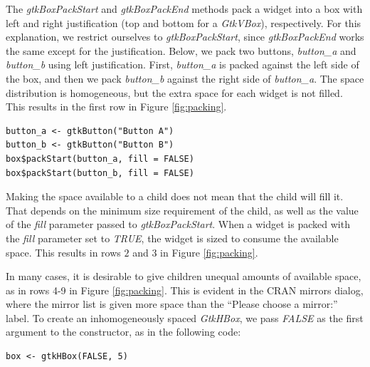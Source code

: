 \documentclass[article]{jss}
\begin{document}
The \emph{gtkBoxPackStart} and \emph{gtkBoxPackEnd} methods pack a widget into a box with left and right justification (top and
bottom for a \emph{GtkVBox}), respectively. For this explanation, we
restrict ourselves to \emph{gtkBoxPackStart}, since
\emph{gtkBoxPackEnd} works the same except for the
justification. Below, we pack two buttons, \emph{button\_a} and
\emph{button\_b} using left justification. First, \emph{button\_a} is packed against the left side of the box, and then we pack \emph{button\_b} against the right side of \emph{button\_a}.
The space distribution is homogeneous, but
the extra space for each widget is not filled. This results in the
first row in Figure \ref{fig:packing}.
\begin{verbatim}
button_a <- gtkButton("Button A")
button_b <- gtkButton("Button B")
box$packStart(button_a, fill = FALSE)
box$packStart(button_b, fill = FALSE)
\end{verbatim}

Making the space available to a child does not mean that the
child will fill it. That depends on the minimum size requirement of the child, as well as the value of the \emph{fill} parameter passed to \emph{gtkBoxPackStart}. When a widget is packed with the \emph{fill} parameter set to \emph{TRUE}, the widget is sized to consume the available space. This results in rows $2$ and $3$ in Figure \ref{fig:packing}.


In many cases, it is desirable to give children unequal amounts of available space, as in rows 4-9 in Figure \ref{fig:packing}. This is evident in the CRAN mirrors dialog, where the mirror list is given more space than the ``Please choose a mirror:'' label. To create an inhomogeneously spaced \emph{GtkHBox}, we pass
\emph{FALSE} as the first argument to the constructor, as in the following code:
\begin{verbatim}
box <- gtkHBox(FALSE, 5)
\end{verbatim}
\end{document}
